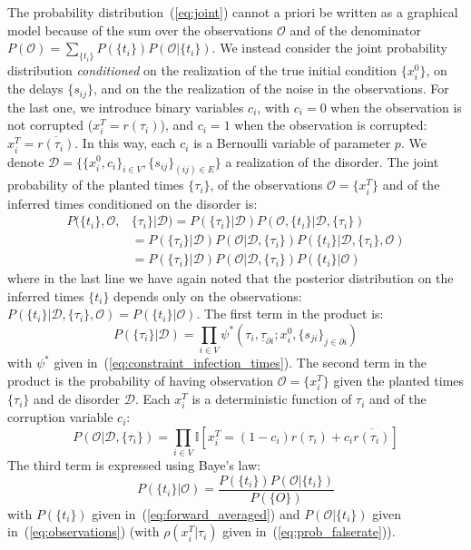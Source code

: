 \documentclass[a4paper, amsfonts, amssymb, amsmath, reprint, showkeys, nofootinbib, twoside, floatfix, pre,superscriptaddress]{revtex4-2}
\begin{document}
The probability distribution~(\ref{eq:joint}) cannot a priori be written as a graphical model because of the sum over the observations $\mathcal{O}$ and of the denominator $P(\mathcal{O})=\sum_{\{t_i\}}P(\{t_i\})P(\mathcal{O}|\{t_i\})$. 
We instead consider the joint probability distribution {\it conditioned} on the realization of the true initial condition $\{x_i^0\}$, on the delays $\{s_{ij}\}$, and on the the realization of the noise in the observations. 
For the last one, we introduce binary variables $c_i$, with $c_i=0$ when the observation is not corrupted ($x_i^T=r(\tau_i)$), and $c_i=1$ when the observation is corrupted: $x_i^T=\overline{r(\tau_i)}$. In this way, each $c_i$ is a Bernoulli variable of parameter $p$.
We denote $\mathcal{D}=\{\{x_i^0, c_i\}_{i\in V}, \{s_{ij}\}_{(ij)\in E}\}$ a realization of the disorder.
The joint probability of the planted times $\{\tau_i\}$, of the observations $\mathcal{O}=\{x_i^T\}$ and of the inferred times conditioned on the disorder is:
\begin{align*}
	P(\{t_i\},\mathcal{O},&\{\tau_i\}|\mathcal{D}) = P(\{\tau_i\}|\mathcal{D})P(\mathcal{O}, \{t_i\}|\mathcal{D},\{\tau_i\}) \\
	&=P(\{\tau_i\}|\mathcal{D})P(\mathcal{O}|\mathcal{D},\{\tau_i\})P(\{t_i\}|\mathcal{D},\{\tau_i\}, \mathcal{O})\\
	&=P(\{\tau_i\}|\mathcal{D})P(\mathcal{O}|\mathcal{D},\{\tau_i\})P(\{t_i\}|\mathcal{O})
\end{align*}
where in the last line we have again noted that the posterior distribution on the inferred times $\{t_i\}$ depends only on the observations: $P(\{t_i\}|\mathcal{D},\{\tau_i\}, \mathcal{O})=P(\{t_i\}|\mathcal{O})$.
The first term in the product is:
$$
	P(\{\tau_i\}|\mathcal{D})=\prod_{i\in V}\psi^*(\tau_i, \underline{\tau}_{\partial i};x_i^0, \{s_{ji}\}_{j\in\partial i})
$$
with $\psi^*$ given in~(\ref{eq:constraint_infection_times}).
The second term in the product is the probability of having observation $\mathcal{O}=\{x_i^T\}$ given the planted times $\{\tau_i\}$ and de disorder $\mathcal{D}$. Each $x_i^T$ is a deterministic function of $\tau_i$ and of the corruption variable $c_i$:
$$
	P(\mathcal{O}|\mathcal{D},\{\tau_i\}) = \prod_{i\in V}\mathbb{I}[x_i^T=(1-c_i)r(\tau_i)+c_i\overline{r(\tau_i)}]
$$
The third term is expressed using Baye's law:
$$
	P(\{t_i\}|\mathcal{O})=\frac{P(\{t_i\})P(\mathcal{O}|\{t_i\})}{P(\{O\})}
$$
with $P(\{t_i\})$ given in~(\ref{eq:forward_averaged}) and $P(\mathcal{O}|\{t_i\})$ given in~(\ref{eq:observations}) (with $\rho(x_i^T|\tau_i)$ given in~(\ref{eq:prob_falserate})).
\end{document}
